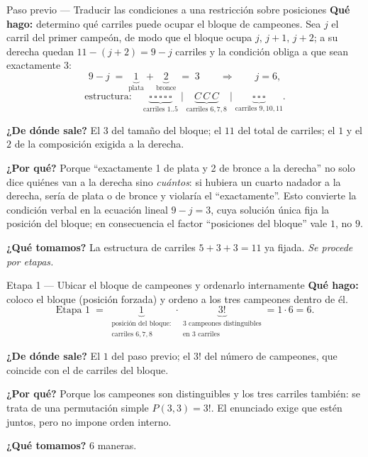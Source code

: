 \documentclass[11pt]{article}
\begin{document}
\begin{paso}{Paso previo --- Traducir las condiciones a una restricci\'on sobre posiciones}
\textbf{Qu\'e hago:} determino qu\'e carriles puede ocupar el bloque de campeones. Sea $j$ el carril del
primer campe\'on, de modo que el bloque ocupa $j,\,j+1,\,j+2$; a su derecha quedan $11-(j+2)=9-j$ carriles y
la condici\'on obliga a que sean exactamente $3$:
\[
9-j\;=\;\underbrace{1}_{\text{plata}}+\underbrace{2}_{\text{bronce}}\;=\;3
\qquad\Longrightarrow\qquad j=6 ,
\]
\[
\text{estructura}:\quad \underbrace{\square\,\square\,\square\,\square\,\square}_{\text{carriles }1..5}\;\big|\;\underbrace{C\,C\,C}_{\text{carriles }6,7,8}\;\big|\;\underbrace{\square\,\square\,\square}_{\text{carriles }9,10,11} .
\]

\textbf{¿De d\'onde sale?} El $3$ del tama\~no del bloque; el $11$ del total de carriles; el $1$ y el $2$ de
la composici\'on exigida a la derecha.

\textbf{¿Por qu\'e?} Porque ``exactamente 1 de plata y 2 de bronce a la derecha'' no solo dice qui\'enes van
a la derecha sino \emph{cu\'antos}: si hubiera un cuarto nadador a la derecha, ser\'ia de plata o de bronce y
violar\'ia el ``exactamente''. Esto convierte la condici\'on verbal en la ecuaci\'on lineal $9-j=3$, cuya
soluci\'on \'unica fija la posici\'on del bloque; en consecuencia el factor ``posiciones del bloque'' vale
$1$, no $9$.

\textbf{¿Qu\'e tomamos?} La estructura de carriles $5+3+3=11$ ya fijada. \emph{Se procede por etapas.}
\end{paso}

\begin{paso}{Etapa 1 --- Ubicar el bloque de campeones y ordenarlo internamente}
\textbf{Qu\'e hago:} coloco el bloque (posici\'on forzada) y ordeno a los tres campeones dentro de \'el.
\[
\text{Etapa 1}\;=\;\underbrace{1}_{\substack{\text{posici\'on del bloque:}\\ \text{carriles }6,7,8}}
\cdot\underbrace{3!}_{\substack{\text{3 campeones distinguibles}\\ \text{en 3 carriles}}}=1\cdot 6=6 .
\]

\textbf{¿De d\'onde sale?} El $1$ del paso previo; el $3!$ del n\'umero de campeones, que coincide con el de
carriles del bloque.

\textbf{¿Por qu\'e?} Porque los campeones son distinguibles y los tres carriles tambi\'en: se trata de una
permutaci\'on simple $P(3,3)=3!$. El enunciado exige que est\'en juntos, pero no impone orden interno.

\textbf{¿Qu\'e tomamos?} $6$ maneras.
\end{paso}
\end{document}
